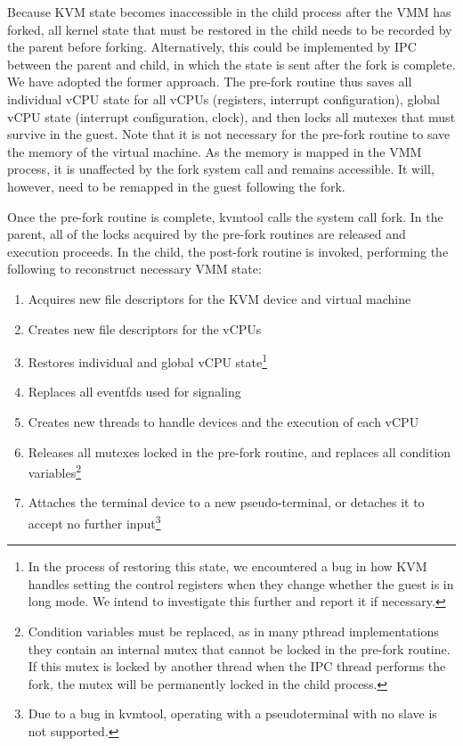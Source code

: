 Because KVM state becomes inaccessible in the child process after the VMM has
forked, all kernel state that must be restored in the child needs to be
recorded by the parent before forking. Alternatively, this could be implemented
by IPC between the parent and child, in which the state is sent after the fork
is complete. We have adopted the former approach. The pre-fork routine thus
saves all individual vCPU state for all vCPUs (registers, interrupt
configuration), global vCPU state (interrupt configuration, clock), and then
locks all mutexes that must survive in the guest. Note that it is not necessary
for the pre-fork routine to save the memory of the virtual machine. As the
memory is mapped in the VMM process, it is unaffected by the fork system call
and remains accessible. It will, however, need to be remapped in the guest
following the fork.

Once the pre-fork routine is complete, kvmtool calls the system call fork. In
the parent, all of the locks acquired by the pre-fork routines are released and
execution proceeds. In the child, the post-fork routine is invoked, performing
the following to reconstruct necessary VMM state:

\begin{enumerate}
\item Acquires new file descriptors for the KVM device and virtual machine
\item Creates new file descriptors for the vCPUs
\item Restores individual and global vCPU state\footnote{In the process of
restoring this state, we encountered a bug in how KVM handles setting the
control registers when they change whether the guest is in long mode. We intend
to investigate this further and report it if necessary.}
\item Replaces all eventfds used for signaling
\item Creates new threads to handle devices and the execution of each vCPU
\item Releases all mutexes locked in the pre-fork routine, and replaces all
condition variables\footnote{Condition variables must be replaced, as in many
pthread implementations they contain an internal mutex that cannot be locked in
the pre-fork routine. If this mutex is locked by another thread when the IPC
thread performs the fork, the mutex will be permanently locked in the child
process.}
\item Attaches the terminal device to a new pseudo-terminal, or detaches it to
accept no further input\footnote{Due to a bug in kvmtool, operating with a
pseudoterminal with no slave is not supported.}
\end{enumerate}

